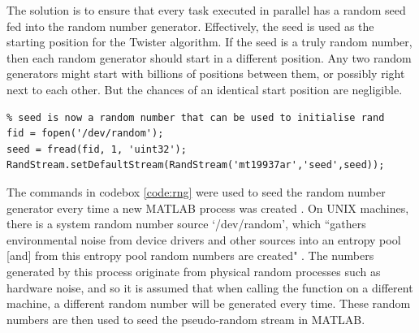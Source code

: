 \documentclass[11pt]{article}
\numberwithin{equation}{subsection}
\begin{document}
The solution is to ensure that every task executed in parallel has a random seed fed into the random number generator. Effectively, the seed is used as the starting position for the Twister algorithm. If the seed is a truly random number, then each random generator should start in a different position. Any two random generators might start with billions of positions between them, or possibly right next to each other. But the chances of an identical start position are negligible.

\begin{lstlisting}[float=ht,style=Matlab-editor,caption = {Seeding random generator},label=code:rng]
% Ensures truly random numbers for each process
% seed is now a random number that can be used to initialise rand
fid = fopen('/dev/random');
seed = fread(fid, 1, 'uint32');
RandStream.setDefaultStream(RandStream('mt19937ar','seed',seed));
\end{lstlisting}

The commands in codebox \ref{code:rng} were used to seed the random number generator every time a new MATLAB process was created \cite{randomblog}. On UNIX machines, there is a system random number source \mbox{`/dev/random'}, which ``gathers environmental noise from device drivers and other sources into an entropy pool [and] from this entropy pool random numbers are created" \cite{devrandom}. The numbers generated by this process originate from physical random processes such as hardware noise, and so it is assumed that when calling the function on a different machine, a different random number will be generated every time. These random numbers are then used to seed the pseudo-random stream in MATLAB.
\end{document}
